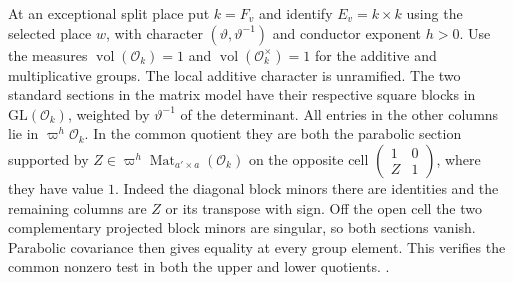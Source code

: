 At an exceptional split place put \(k=F_v\) and identify
\(E_v=k\times k\) using the selected place \(w\), with character
\((\vartheta,\vartheta^{-1})\) and conductor exponent \(h>0\).
Use the measures \(\operatorname{vol}(\mathcal O_k)=1\) and
\(\operatorname{vol}(\mathcal O_k^\times)=1\) for the additive and
multiplicative groups. The local additive character is unramified.
The two standard sections in the matrix model have their respective
square blocks in \(\mathrm{GL}(\mathcal O_k)\), weighted by
\(\vartheta^{-1}\) of the determinant. All entries in the other
columns lie in \(\varpi^h\mathcal O_k\). In the common quotient they
are both the parabolic section supported by
\(Z\in \varpi^h\operatorname{Mat}_{a'\times a}(\mathcal O_k)\) on
the opposite cell \(\left(\begin{smallmatrix}1&0\\Z&1\end{smallmatrix}\right)\),
where they have value \(1\). Indeed the diagonal block minors there
are identities and the remaining columns are \(Z\) or its transpose
with sign. Off the open cell the two complementary projected block
minors are singular, so both sections vanish. Parabolic covariance
then gives equality at every group element. This verifies the common
nonzero test in both the upper and lower quotients.
.

